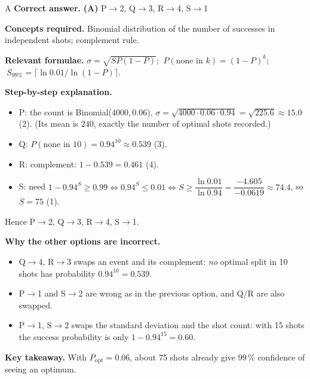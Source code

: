 \documentclass[11pt,a4paper]{article}
\newcommand{\qsep}{\par\vspace{2pt}{\color{black!15}\hrule}\vspace{4pt}}
\begin{document}
\begin{solbox}{A}
\textbf{\color{brand}Correct answer.} \textcolor{okgreen}{\textbf{(A)}} P$\to$2, Q$\to$3, R$\to$4, S$\to$1

\textbf{\color{brand}Concepts required.} Binomial distribution of the number of successes in independent shots; complement rule.

\textbf{\color{brand}Relevant formulae.} $\sigma = \sqrt{SP(1-P)}$; $\ P(\text{none in } k) = (1-P)^k$; $\ S_{99\%} = \lceil \ln 0.01/\ln(1-P)\rceil$.

\textbf{\color{brand}Step-by-step explanation.} \begin{itemize}\itemsep0pt
\item P: the count is Binomial($4000, 0.06$), $\sigma = \sqrt{4000\cdot0.06\cdot0.94} = \sqrt{225.6} \approx 15.0$ (2).
(Its mean is $240$, exactly the number of optimal shots recorded.)
\item Q: $P(\text{none in } 10) = 0.94^{10} \approx 0.539$ (3).
\item R: complement: $1 - 0.539 = 0.461$ (4).
\item S: need $1 - 0.94^S \ge 0.99 \iff 0.94^S \le 0.01 \iff S \ge \dfrac{\ln 0.01}{\ln 0.94} = \dfrac{-4.605}{-0.0619} \approx 74.4$,
so $S = 75$ (1).
\end{itemize}
Hence P$\to$2, Q$\to$3, R$\to$4, S$\to$1.

\textbf{\color{brand}Why the other options are incorrect.}
\begin{itemize}[leftmargin=2.4em, itemsep=1pt, topsep=2pt]
\item[\textbf{(B)}] Q$\to$4, R$\to$3 swaps an event and its complement: \emph{no} optimal split in 10 shots has probability $0.94^{10} = 0.539$.
\item[\textbf{(C)}] P$\to$1 and S$\to$2 are wrong as in the previous option, and Q/R are also swapped.
\item[\textbf{(D)}] P$\to$1, S$\to$2 swaps the standard deviation and the shot count: with 15 shots the success probability is only $1 - 0.94^{15} = 0.60$.
\end{itemize}
\textbf{\color{brand}Key takeaway.} With $P_{\text{opt}} = 0.06$, about 75 shots already give $99\,\%$ confidence of seeing an optimum.
\end{solbox}
\qsep
\end{document}
